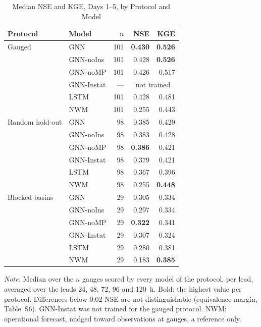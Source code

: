 \begin{table}
\caption{Median NSE and KGE, Days 1--5, by Protocol and Model}
\label{tab:skill}
\footnotesize
\setlength{\parindent}{0pt}
\renewcommand{\arraystretch}{1.2}
\begin{tabular}{@{}llrrr@{}}
\toprule
Protocol & Model & $n$ & NSE & KGE \\
\midrule
Gauged & GNN & 101 & \textbf{0.430} & \textbf{0.526} \\
 & GNN-noIns & 101 & 0.428 & \textbf{0.526} \\
 & GNN-noMP & 101 & 0.426 & 0.517 \\
 & GNN-Instat & --- & \multicolumn{2}{c}{not trained} \\
 & LSTM & 101 & 0.428 & 0.481 \\
 & NWM & 101 & 0.255 & 0.443 \\
\addlinespace
Random hold-out & GNN & 98 & 0.385 & 0.429 \\
 & GNN-noIns & 98 & 0.383 & 0.428 \\
 & GNN-noMP & 98 & \textbf{0.386} & 0.421 \\
 & GNN-Instat & 98 & 0.379 & 0.421 \\
 & LSTM & 98 & 0.367 & 0.396 \\
 & NWM & 98 & 0.255 & \textbf{0.448} \\
\addlinespace
Blocked basins & GNN & 29 & 0.305 & 0.334 \\
 & GNN-noIns & 29 & 0.297 & 0.334 \\
 & GNN-noMP & 29 & \textbf{0.322} & 0.341 \\
 & GNN-Instat & 29 & 0.307 & 0.324 \\
 & LSTM & 29 & 0.280 & 0.381 \\
 & NWM & 29 & 0.183 & \textbf{0.385} \\
\bottomrule
\end{tabular}
\begin{flushleft}
\footnotesize \emph{Note.} Median over the $n$ gauges scored by every model of the protocol, per lead, averaged over the leads 24, 48, 72, 96 and 120~h. Bold: the highest value per protocol. Differences below 0.02 NSE are not distinguishable (equivalence margin, Table~S6). GNN-Instat was not trained for the gauged protocol. NWM: operational forecast, nudged toward observations at gauges, a reference only.
\end{flushleft}
\end{table}
